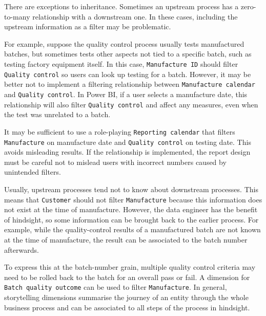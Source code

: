 \documentclass[10pt,openany,10pt]{book}
\begin{document}
There are exceptions to inheritance. Sometimes an upstream process has a
zero-to-many relationship with a downstream one. In these cases,
including the upstream information as a filter may be problematic.

For example, suppose the quality control process usually tests
manufactured batches, but sometimes tests other aspects not tied to a
specific batch, such as testing factory equipment itself. In this case,
\texttt{\textquotesingle{}Manufacture\ ID\textquotesingle{}} should
filter \texttt{\textquotesingle{}Quality\ control\textquotesingle{}} so
users can look up testing for a batch. However, it may be better not to
implement a filtering relationship between
\texttt{\textquotesingle{}Manufacture\ calendar\textquotesingle{}} and
\texttt{\textquotesingle{}Quality\ control\textquotesingle{}}. In Power
BI, if a user selects a manufacture date, this relationship will also
filter \texttt{\textquotesingle{}Quality\ control\textquotesingle{}} and
affect any measures, even when the test was unrelated to a batch.

It may be sufficient to use a role-playing
\texttt{\textquotesingle{}Reporting\ calendar\textquotesingle{}} that
filters \texttt{\textquotesingle{}Manufacture\textquotesingle{}} on
manufacture date and
\texttt{\textquotesingle{}Quality\ control\textquotesingle{}} on testing
date. This avoids misleading results. If the relationship is
implemented, the report design must be careful not to mislead users with
incorrect numbers caused by unintended filters.

Usually, upstream processes tend not to know about downstream processes.
This means that \texttt{\textquotesingle{}Customer\textquotesingle{}}
should not filter
\texttt{\textquotesingle{}Manufacture\textquotesingle{}} because this
information does not exist at the time of manufacture. However, the data
engineer has the benefit of hindsight, so some information can be
brought back to the earlier process. For example, while the
quality-control results of a manufactured batch are not known at the
time of manufacture, the result can be associated to the batch number
afterwards.

To express this at the batch-number grain, multiple quality control
criteria may need to be rolled back to the batch for an overall pass or
fail. A dimension for
\texttt{\textquotesingle{}Batch\ quality\ outcome\textquotesingle{}} can
be used to filter
\texttt{\textquotesingle{}Manufacture\textquotesingle{}}. In general,
storytelling dimensions summarise the journey of an entity through the
whole business process and can be associated to all steps of the process
in hindsight.
\end{document}

